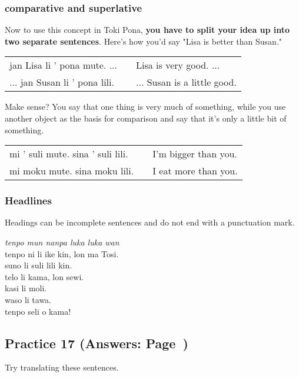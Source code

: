 \subsubsection*{comparative and superlative} 
%
Now to use this concept in Toki Pona, \textbf{you have to split your idea up into two separate sentences}. 
Here's how you'd say "Lisa is better than Susan."

\begin{supertabular}{p{5,5cm}|ll}
jan Lisa li ' pona mute. ...  && Lisa is very good. ... \\ %
... jan Susan li ' pona lili. && ... Susan is a little good. \\ %
\end{supertabular} 

Make sense? 
You say that one thing is very much of something, while you use another object as the basis for comparison and say that it's only a little bit of something. 

\begin{supertabular}{p{5,5cm}|ll}
mi ' suli mute. sina ' suli lili. && I'm bigger than you. \\
mi moku mute. sina moku lili. && I eat more than you. \\
\end{supertabular} 
%
\subsubsection*{Headlines} 
%
Headings can be incomplete sentences and do not end with a punctuation mark.

\textit{tenpo mun nanpa luka luka wan} \\
tenpo ni li ike kin, lon ma Tosi. \\
suno li suli lili kin. \\ 
telo li kama, lon sewi. \\
kasi li moli. \\
waso li tawa. \\
tenpo seli o kama! 

\subsection*{Practice 17 (Answers: Page~\pageref{'la'})}
%
Try translating these sentences.

